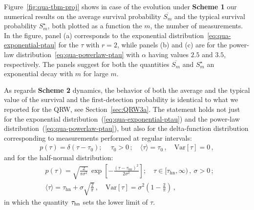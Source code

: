 \documentclass[12pt]{iopart}
\begin{document}
Figure~\ref{fig:qua-tbm-proj} shows in case of the evolution
under \textbf{Scheme 1} our numerical results on the average survival
probability $\overline{S_m}$ and the typical survival probability $S_m^\star$, both plotted as a
function the $m$, the number of measurements.  In the figure, panel (a)
corresponds to the exponential distribution~\eqref{eq:qua-exponential-ptau} for the $\tau$ with $r=2$, while panels (b) and (c) are for
the power-law distribution~\eqref{eq:qua-powerlaw-ptau} with $\alpha$ having values
$2.5$ and $3.5$, respectively. The panels suggest for both
the quantities $\overline{S_m}$ and $S_m^\star$ an
exponential decay with $m$ for large $m$. 

As regards {\bf Scheme 2} dynamics,  the behavior of both the average and the typical value of the survival and the first-detection probability is identical to what we reported for the QRW, see Section~\ref{sec:QRW3a}.  The statement holds not just for the exponential distribution~(\ref{eq:qua-exponential-ptau}) and the power-law distribution~(\ref{eq:qua-powerlaw-ptau}), but also for the delta-function distribution corresponding to measurements performed at regular intervals:
\begin{align}
p(\tau)=\delta(\tau-\tau_0);~\quad \tau_0>0\, ; \quad \langle \tau \rangle = \tau_0 \, , \quad {\mathrm{Var}}[\tau] = 0 \, ,
\label{eq:qua-delta-ptau}
\end{align}
and for the half-normal distribution:
\begin{equation}
\begin{aligned}
& p(\tau)= \sqrt{\frac{2}{ \pi \sigma^2} } \, \exp\left[ - \frac{(\tau-\tau_{\mathrm{hn}})^2}{2 \sigma^2} \right]  ; \quad \tau \in [\tau_{\mathrm{hn}},\infty) \,, ~\sigma > 0  \, ; \\ 
& \langle \tau \rangle = \tau_{\mathrm{hn}} + \sigma \sqrt{\frac{2}{\pi}} \,  , \quad {\mathrm{Var}}[\tau] = \sigma^2\left(1 -\frac{2}{\pi}\right)\, ,
\label{eq:qua-hn-ptau}
\end{aligned}
\end{equation}
in which the quantity $\tau_{\rm hn}$ sets the lower limit of $\tau$.
\end{document}
